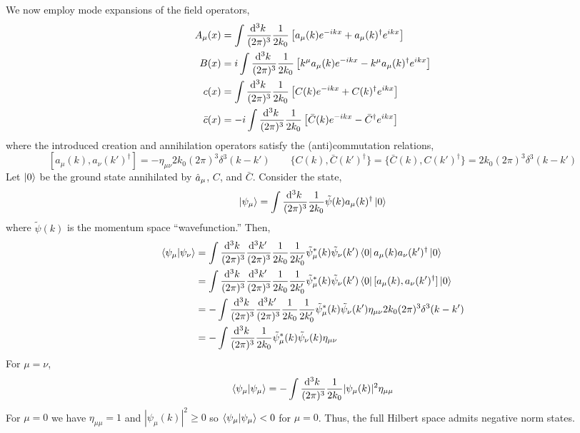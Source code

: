 \documentclass[12pt]{article}
\begin{document}
We now employ mode expansions of the field operators,
\begin{align*}
A_\mu(x) & = \int \frac{\mathrm{d}^{3} k \:}{(2 \pi)^3} \frac{1}{2 k_0} \left[ a_\mu(k)  e^{-i k x} + a_\mu(k)^\dagger e^{i k x} \right]
\\
B(x) & = i \int \frac{\mathrm{d}^{3} k \:}{(2 \pi)^3} \frac{1}{2 k_0} \left[ k^\mu a_\mu(k) e^{- i k x} - k^\mu a_\mu(k)^\dagger e^{ikx} \right]
\\
c(x) & = \int \frac{\mathrm{d}^{3} k \:}{(2 \pi)^3} \frac{1}{2 k_0} \left[ C(k) e^{ - ikx} + C(k)^\dagger e^{ikx} \right]
\\
\bar{c}(x) & = -i \int \frac{\mathrm{d}^{3} k \:}{(2 \pi)^3} \frac{1}{2 k_0} \left[ \bar{C}(k) e^{- ikx} - \bar{C}^\dagger e^{ikx} \right]
\end{align*}
where the introduced creation and annihilation operators satisfy the (anti)commutation relations,
\[ [a_\mu(k), a_\nu(k')^\dagger] = -\eta_{\mu \nu} 2 k_0 (2 \pi)^3 \delta^3(k - k') \quad \quad \{ C(k), \bar{C}(k')^\dagger \} = \{ \bar{C}(k), C(k')^\dagger \} = 2 k_0 (2 \pi)^3 \delta^3(k - k') \]
Let $\left| 0 \right>$ be the ground state annihilated by $\hat{a}_\mu$, $C$, and $\bar{C}$. Consider the state,
\[ \left| \psi_\mu \right> = \int \frac{\mathrm{d}^{3} k \:}{(2 \pi)^3} \frac{1}{2 k_0} \tilde{\psi}(k) a_\mu(k)^\dagger \left| 0 \right> \]
where $\tilde{\psi}(k)$ is the momentum space ``wavefunction.'' Then,
\begin{align*}
\left< \psi_\mu | \psi_\nu \right> & = \int \frac{\mathrm{d}^{3} k \:}{(2 \pi)^3} \frac{\mathrm{d}^{3} k' \:}{(2 \pi)^3} \frac{1}{2 k_0} \frac{1}{2 k_0'} \tilde{\psi}_\mu^*(k) \tilde{\psi}_\nu(k') \left< 0 \right| a_\mu(k) a_\nu(k')^\dagger \left| 0 \right> 
\\
& = \int \frac{\mathrm{d}^{3} k \:}{(2 \pi)^3} \frac{\mathrm{d}^{3} k' \:}{(2 \pi)^3} \frac{1}{2 k_0} \frac{1}{2 k_0'} \tilde{\psi}_\mu^*(k) \tilde{\psi}_\nu(k') \left< 0 \right| [ a_\mu(k),  a_\nu(k')^\dagger] \left| 0 \right> 
\\
& = - \int \frac{\mathrm{d}^{3} k \:}{(2 \pi)^3} \frac{\mathrm{d}^{3} k' \:}{(2 \pi)^3} \frac{1}{2 k_0} \frac{1}{2 k_0'} \tilde{\psi}_\mu^*(k) \tilde{\psi}_\nu(k') \eta_{\mu\nu} 2 k_0 (2\pi)^3 \delta^3(k - k')
\\
& = -\int \frac{\mathrm{d}^{3} k \:}{(2 \pi)^3} \frac{1}{2 k_0} \tilde{\psi}_\mu^*(k) \tilde{\psi}_\nu(k) \eta_{\mu\nu} 
\end{align*}
For $\mu = \nu$,
\[ \left< \psi_\mu | \psi_\mu \right> = - \int \frac{\mathrm{d}^{3} k \:}{(2 \pi)^3} \frac{1}{2 k_0} |\psi_\mu(k)|^2 \eta_{\mu \mu} \]
For $\mu = 0$ we have $\eta_{\mu \mu} = 1$ and $|\psi_\mu(k)|^2 \ge 0$ so $\left< \psi_\mu | \psi_\mu \right> < 0$ for $\mu = 0$. Thus, the full Hilbert space admits negative norm states. 
\end{document}

